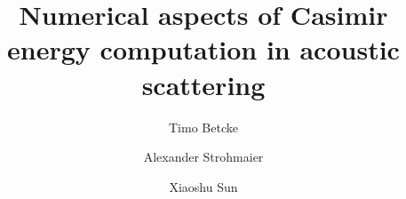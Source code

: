 \documentclass[review]{elsarticle}
\begin{document}
\begin{frontmatter}

\title{Numerical aspects of Casimir energy computation in acoustic scattering}

\author[mymainaddress]{Timo Betcke}
\address[mymainaddress]{Department of Mathematics, University College London, London, WC1E 6BT, UK}


\author[mysecondaryaddress]{Alexander Strohmaier}
\address[mysecondaryaddress]{School of Mathematics, University of Leeds, Leeds, LS2 9JT, UK}

\author[mymainaddress]{Xiaoshu Sun}





\end{frontmatter}
\end{document}
